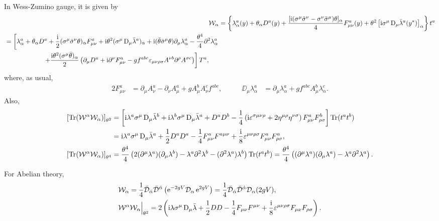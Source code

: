 \documentclass[CheatSheet]{subfiles}
\newcommand{\OD}{{\mathcal D}}
\begin{document}
In Wess-Zumino gauge, it is given by
\begin{align}
\mathcal W_\alpha &=\left\{
\lambda_{\alpha}^{a}(y)+\theta_\alpha D^{a}(y)+\frac{[\mathrm{i}(\sigma^{\mu}\bar\sigma^{\nu}-\sigma^{\nu}\bar\sigma^{\mu})\theta]_\alpha}{4} F^a_{\mu\nu}(y)
+\theta^2 \left[\mathrm{i}\sigma^{\mu}\mathop{}\!\mathrm{D}_\mu\bar{\lambda}^a(y^*)\right]_\alpha
\right\}t^a
\\\begin{split}&=\left[
\lambda_{\alpha}^{a}+\theta_\alpha D^{a}+\frac{\mathrm{i}}{2} (\sigma^{\mu}\bar\sigma^{\nu}\theta)_\alpha F^a_{\mu\nu}
+\mathrm{i} \theta^2(\sigma^{\mu}\mathop{}\!\mathrm{D}_{\mu}\bar{\lambda}^{a})_\alpha
+\mathrm{i}(\bar\theta\bar\sigma^{\mu}\theta)\partial_{\mu}\lambda _{\alpha}^{a}
-\frac{\theta^4}{4} \partial^2\lambda _{\alpha}^{a}
\right.\\&\qquad\qquad\qquad\left.
+\frac{\mathrm{i}\theta^2(\sigma^{\mu}\bar\theta)_{\alpha}}{2} \left(\partial_{\mu}D^{a}
+\mathrm{i}\partial^\nu F^a_{\mu\nu}
- gf^{abc}\varepsilon_{\mu\nu \rho\sigma}  A^{\nu b}\partial^{\rho}A^{\sigma c}
\right)\right]T^{a},
\end{split}
\end{align}
where, as usual,
\begin{alignat}{2}
F^a_{\mu\nu}&=\partial_{\mu}A_\nu^a-\partial_{\nu}A_\mu^a+g A_\mu^b A_\nu^c f^{abc},
&\qquad
\DD_\mu\lambda^a_\alpha
&=\partial_{\mu}\lambda^{a}_\alpha+g f^{abc}A_\mu^{b}\lambda^{c}_\alpha.
\end{alignat}
Also,
\begin{align}
 \left[\operatorname{\mathrm{Tr}}(\mathcal W^\alpha\mathcal W_\alpha)\right]_{\theta^2}
&=
\left[
\mathrm{i}\lambda^a\sigma^{\mu}\mathop{}\!\mathrm{D}_{\mu}\bar{\lambda}^{b}
+\mathrm{i}\lambda^b\sigma^{\mu}\mathop{}\!\mathrm{D}_{\mu}\bar{\lambda}^{a}
+D^a D^{b}
-\frac{1}{4}\left(\mathrm{i} \varepsilon^{\sigma\mu \nu\rho}+2\eta^{\mu\rho}\eta^{\nu\sigma}\right)
F^a_{\mu\nu}F^b_{\rho\sigma}
\right]
\operatorname{\mathrm{Tr}}(t^at^b)
\\
&=
\mathrm{i}\lambda^a\sigma^{\mu}\mathop{}\!\mathrm{D}_{\mu}\bar{\lambda}^a
+\frac12D^a D^a
-\frac14F^a_{\mu\nu}F^{a\mu\nu}
+\frac{\mathrm{i}}{8}\varepsilon^{\mu \nu\rho\sigma}
F^a_{\mu\nu}F^a_{\rho\sigma},
\\
 \left[\operatorname{\mathrm{Tr}}(\mathcal W^\alpha\mathcal W_\alpha)\right]_{\theta^4}
&=
\frac{\theta^4}{4} \left(2 (\partial^{\mu}\lambda^{a})(\partial_{\mu}\lambda^{b})-\lambda^{a}\partial^2\lambda^{b}-(\partial^2\lambda^{a})\lambda^b\right)\operatorname{\mathrm{Tr}}(t^at^b)
=
\frac{\theta^4}{4} \left((\partial^{\mu}\lambda^{a})(\partial_{\mu}\lambda^{a})-\lambda^{a}\partial^2\lambda^{a}\right).
\end{align}

For Abelian theory,
\begin{align}
& \mathcal W_\alpha = \frac14\bar\OD_\dalpha\bar\OD^\dalpha\left(\ee^{-2gV}\OD_\alpha\ee^{2gV}\right)
=\frac14\bar\OD_\dalpha\bar\OD^\dalpha\OD_\alpha(2gV),
\\
& \mathcal W^\alpha\mathcal W_\alpha\Big|_{\theta^2}
=2\left(
\ii\lambda\sigma^{\mu}\DD_{\mu}\bar{\lambda}
+\frac12DD
-\frac14F_{\mu\nu}F^{\mu\nu}
+\frac{\ii}{8}\vep^{\mu \nu\rho\sigma}
F_{\mu\nu}F_{\rho\sigma}\right).
\end{align}
\end{document}

